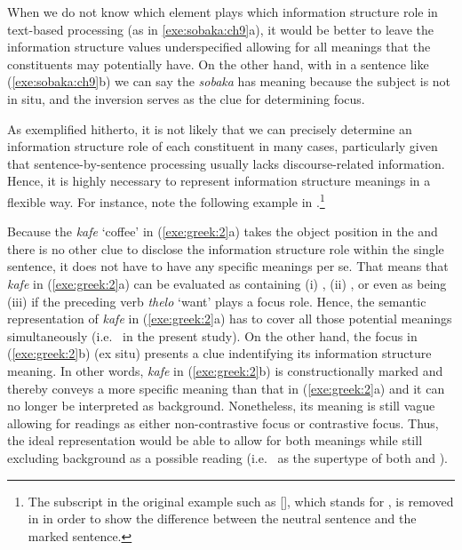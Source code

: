 \noindent When we do not know which element plays which information
structure role in text-based processing (as in \ref{exe:sobaka:ch9}a),
it would be better to leave the information structure values
underspecified allowing for all meanings that the constituents may
potentially have. On the other hand, with in a sentence like
(\ref{exe:sobaka:ch9}b) we can say the \textit{sobaka} has 
meaning because the subject is not in situ, and the inversion
serves as the clue for determining focus.


As exemplified hitherto, it is not likely that we can precisely
determine an information structure role of each constituent in many
cases, particularly given that sentence-by-sentence processing usually
lacks discourse-related information.  Hence, it is highly necessary to
represent information structure meanings in a flexible way.  For
instance, note the following example in .\footnote{The
  subscript in the original example such as [], which
  stands for , is removed in
   in order to show the difference between the
  neutral sentence and the marked sentence.}




\noindent Because the   \textit{kafe} `coffee' in
(\ref{exe:greek:2}a) takes the object position in the  and there is no other clue to disclose the information
structure role within the single sentence, it does not have to have
any specific meanings per se. That means that \textit{kafe}
in (\ref{exe:greek:2}a) can be evaluated as containing (i)
, (ii) , or even as being (iii)
 if the preceding verb \textit{thelo} `want' plays a
focus role. Hence, the semantic representation of \textit{kafe} in
(\ref{exe:greek:2}a) has to cover all those potential meanings
simultaneously (i.e.\  in the present study).  On the
other hand, the  focus in (\ref{exe:greek:2}b)
(ex situ) presents a clue indentifying its information
structure meaning.  In other words, \textit{kafe} in
(\ref{exe:greek:2}b) is constructionally marked and thereby conveys a
more specific meaning than that in (\ref{exe:greek:2}a) and it can no
longer be interpreted as background. Nonetheless, its meaning is still
vague allowing for readings as either non-contrastive focus or
contrastive focus. Thus, the ideal representation would be able to
allow for both meanings while still excluding background as a possible
reading (i.e.\  as the supertype of both
 and ).


